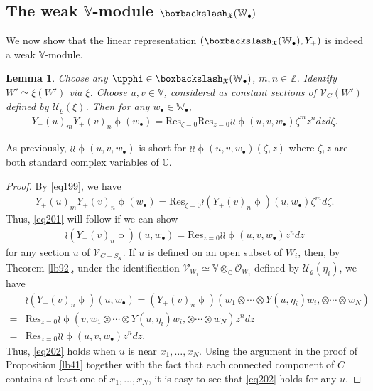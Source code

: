 \documentclass[12pt,a4paper,notitlepage]{report}
\theoremstyle{definition}
\theoremstyle{plain}
\newtheorem{lm}[df]{Lemma}
\newcommand{\fk}{\mathfrak}
\newcommand{\mc}{\mathcal}
\newcommand{\Res}{\mathrm{Res}}
\newcommand{\scr}{\mathscr}
\newcommand{\SX}{S_{\fk X}}
\newcommand{\blt}{\bullet}
\newcommand{\Vbb}{\mathbb V}
\newcommand{\Wbb}{\mathbb W}
\newcommand{\Cbb}{\mathbb C}
\newcommand{\Zbb}{\mathbb Z}
\numberwithin{equation}{section}
\begin{document}
\subsection*{The weak $\Vbb$-module $\boxbackslash_{\fk X}(\Wbb_\blt)$}


We now show that the linear representation  $(\boxbackslash_{\fk X}(\Wbb_\blt),Y_+)$ is indeed a weak $\Vbb$-module.

\begin{lm}\label{lb95}
Choose any $\upphi\in\boxbackslash_{\fk X}(\Wbb_\blt)$, $m,n\in\Zbb$. Identify $W'\simeq\xi(W')$ via $\xi$. Choose $u,v\in\Vbb$, considered as constant sections of $\scr V_C(W')$ defined by $\mc U_\varrho(\xi)$. Then for any $w_\blt\in\Wbb_\blt$,
\begin{align}
Y_+(u)_m Y_+(v)_n\upphi(w_\blt)=\Res_{\zeta=0}\Res_{z=0}\wr\wr\upphi(u,v,w_\blt)\zeta^m z^n dzd\zeta.\label{eq201}
\end{align}
\end{lm}

As previously, $\wr\wr\upphi(u,v,w_\blt)$ is short for $\wr\wr\upphi(u,v,w_\blt)(\zeta,z)$ where $\zeta,z$ are both standard complex variables of $\Cbb$.

\begin{proof}
By \eqref{eq199}, we have
\begin{align*}
Y_+(u)_m Y_+(v)_n\upphi(w_\blt)=\Res_{\zeta=0}\wr(Y_+(v)_n\upphi)(u,w_\blt)\zeta^md\zeta.
\end{align*}
Thus, \eqref{eq201} will follow if we can show
\begin{align}
\wr(Y_+(v)_n\upphi)(u,w_\blt)=\Res_{z=0}\wr\wr\upphi(u,v,w_\blt) z^n dz\label{eq202}
\end{align}
for any section $u$ of $\scr V_{C-\SX}$. If $u$ is defined on an open subset of $W_i$, then, by Theorem \ref{lb92}, under the identification $\scr V_{W_i}\simeq\Vbb\otimes_\Cbb\scr O_{W_i}$ defined by $\mc U_\varrho(\eta_i)$, we have
\begin{align*}
&\wr(Y_+(v)_n\upphi)(u,w_\blt)=(Y_+(v)_n\upphi)(w_1\otimes\cdots\otimes Y(u,\eta_i)w_i,\otimes\cdots\otimes w_N)\\
=&\Res_{z=0}\wr\upphi(v,w_1\otimes\cdots\otimes Y(u,\eta_i)w_i,\otimes\cdots\otimes w_N)z^ndz\\
=& \Res_{z=0}\wr\wr\upphi(u,v,w_\blt)z^ndz.
\end{align*}
Thus, \eqref{eq202} holds when $u$ is near $x_1,\dots,x_N$.  Using the argument in the proof of Proposition \ref{lb41} together with the fact that each connected component of $C$ contains at least one of $x_1,\dots,x_N$, it is easy to see that \eqref{eq202} holds for any $u$.
\end{proof}
\end{document}
